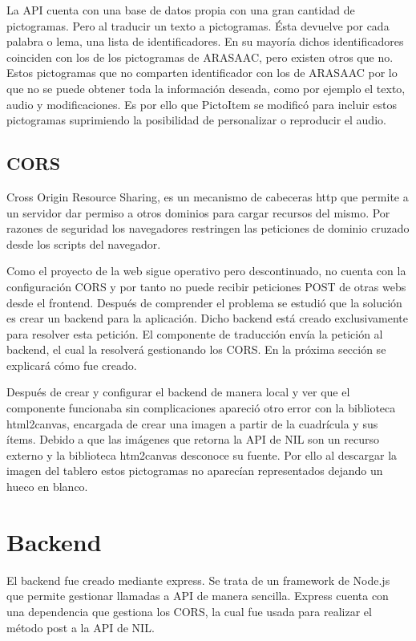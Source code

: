 La API cuenta con una base de datos propia con una gran cantidad de pictogramas. Pero al traducir un texto a pictogramas. Ésta devuelve por cada palabra o lema, una lista de identificadores. En su mayoría dichos identificadores coinciden con los de los pictogramas de ARASAAC, pero existen otros que no. Estos pictogramas que no comparten identificador con los de ARASAAC por lo que no se puede obtener toda la información deseada, como por ejemplo el texto, audio y modificaciones. Es por ello que PictoItem se modificó para incluir estos pictogramas suprimiendo la posibilidad de personalizar o reproducir el audio.


\subsection{CORS}

Cross Origin Resource Sharing, es un mecanismo de cabeceras http que permite a un servidor dar permiso a otros dominios para cargar recursos del mismo. Por razones de seguridad los navegadores restringen las peticiones de dominio cruzado desde los scripts del navegador. 


Como el proyecto de la web sigue operativo pero descontinuado, no cuenta con la configuración CORS y por tanto no puede recibir peticiones POST de otras webs desde el frontend. Después de comprender el problema se estudió que la solución es crear un backend para la aplicación. Dicho backend está creado exclusivamente para resolver esta petición. El componente de traducción envía la petición al backend, el cual la resolverá gestionando los CORS. En la próxima sección se explicará cómo fue creado. 


Después de crear y configurar el backend de manera local y ver que el componente funcionaba sin complicaciones apareció otro error con la biblioteca html2canvas, encargada de crear una imagen a partir de la cuadrícula y sus ítems. Debido a que las imágenes que retorna la API de NIL son un recurso externo y la biblioteca htm2canvas desconoce su fuente. Por ello al descargar la imagen del tablero estos pictogramas no aparecían representados dejando un hueco en blanco.

\section*{Backend}

El backend fue creado mediante express. Se trata de un framework de Node.js que permite gestionar llamadas a API de manera sencilla. Express cuenta con una dependencia que gestiona los CORS, la cual fue usada para realizar el método post a la API de NIL. 

